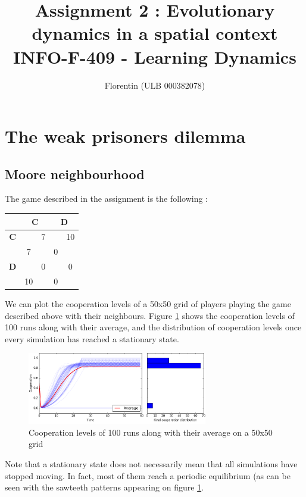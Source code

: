 \documentclass[a4paper]{article}
\title{
    Assignment 2 : Evolutionary dynamics in a spatial context\\
    \small INFO-F-409 - Learning Dynamics
}
\author{Florentin \bsc{Hennecker} (ULB 000382078)}
\date{}
\begin{document}
\maketitle

\section{The weak prisoners dilemma}

\subsection{Moore neighbourhood}
The game described in the assignment is the following :
\begin{table}[H]
\centering
\begin{tabular}{c|cc|cc}
	& \multicolumn{2}{c|}{\textbf{C}} & \multicolumn{2}{c}{\textbf{D}}\\
	\hline
	\textbf{C} && 7 && 10\\
	& 7 && 0 &\\
	\hline
	\textbf{D} && 0 && 0\\
	& 10 && 0 &\\
\end{tabular}
\end{table}

We can plot the cooperation levels of a 50x50 grid of players playing the game
described above with their neighbours. Figure \ref{n50} shows the cooperation
levels of 100 runs along with their average, and the distribution of
cooperation levels once every simulation has reached a stationary state.
\begin{figure}[H]
	\centering
	\includegraphics[width=0.7\textwidth]{./fig/n50.png}
	\caption{Cooperation levels of 100 runs along with their average
	on a 50x50 grid}
	\label{n50}
\end{figure}
Note that a stationary state does not necessarily mean that all simulations
have stopped moving. In fact, most of them reach a periodic equilibrium (as
can be seen with the sawteeth patterns appearing on figure \ref{n50}.\\
\end{document}
